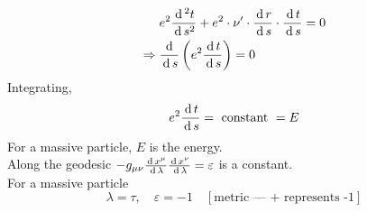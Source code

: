 \documentclass[../main-sheet.tex]{subfiles}
\begin{document}
\begin{soln}
        \begin{align*}
            &e^2\frac{\,\mathrm{d}\,^{2} t}{\,\mathrm{d}\, s^{2}}+e^2\cdot \nu'\cdot\frac{\,\mathrm{d}\, r}{\,\mathrm{d}\, s}\cdot\frac{\,\mathrm{d}\, t}{\,\mathrm{d}\, s}=0\\
            \Rightarrow\;&\frac{\,\mathrm{d}\, }{\,\mathrm{d}\, s}\left( e^2\frac{\,\mathrm{d}\, t}{\,\mathrm{d}\, s} \right)=0
        \end{align*}
        Integrating,
        \begin{equation}
            e^2\frac{\,\mathrm{d}\, t}{\,\mathrm{d}\, s}=\text{ constant }=E
            \label{eq:planet12}
        \end{equation}
        For a massive particle, \(E\) is the energy.\\
        Along the geodesic
        \(-g_{\mu\nu}\frac{\,\mathrm{d}\, x^\mu}{\,\mathrm{d}\, \lambda}\frac{\,\mathrm{d}\, x^\nu}{\,\mathrm{d}\, \lambda}=\varepsilon\)
        is a constant.\\
        For a massive particle
        \[\lambda=\tau,\quad\varepsilon=-1\quad [\text{metric --- + represents -1}]\]
    \end{soln}
\end{document}
